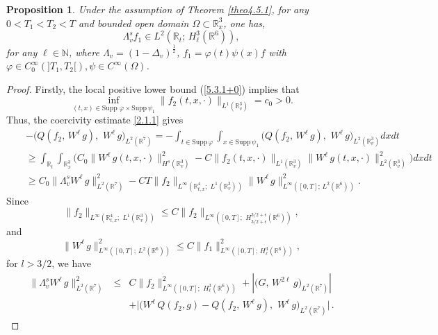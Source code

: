 \documentclass{amsart}[12pt, article]
\newtheorem{prop}[theo]{Proposition}
\begin{document}
\begin{prop}\label{prop5.3.1}
Under the assumption of Theorem \ref{theo4.5.1}, for any
$0<T_1<T_2<T$ and  bounded open domain $\Omega\subset{{{\mathbb R}}}^3_x$,
one has,
\begin{equation*}\label{5.3.4}
\Lambda^s_v f_1\in L^2({{{\mathbb R}}}_t;\, H^3_\ell  ({{{\mathbb R}}}^6)),
\end{equation*}
for any $\ell\in{{\mathbb N}}$, where $\Lambda_v=(1-\Delta_v)^{\frac 12}$,
$f_1=\varphi(t)\psi(x) f$ with
$\varphi\in C^\infty_0(]T_1, T_2[), \psi\in C^\infty(\Omega)$.
\end{prop}

\begin{proof} Firstly,  the local positive lower bound
(\ref{5.3.1+0}) implies that
 $$
 \inf_{(t,  x)\in \mbox{Supp}\,\,\varphi \times \mbox{Supp}\,\psi_1}
 \|{f_2}(t, x, \cdot)\|_{L^1({{{\mathbb R}}}^3_v)}=c_0>0.
 $$
Thus, the coercivity estimate \eqref{2.1.1} gives
\begin{eqnarray*}
&&-\Big(Q({f_2},\,  W^{\ell}\, g),\,\,
 W^{\ell}\, g\Big)_{L^2({{{\mathbb R}}}^7)}=-\int_{t\in
 \mbox{Supp}\,\varphi }\int_{x\in
 \mbox{Supp}\,\psi_1 }\Big(Q({f_2},\,  W^{\ell}\, g),\,\,
W^{\ell}\, g\Big)_{L^2({{{\mathbb R}}}^3_v)} dx dt
\\
&& \geq \int_{{{{\mathbb R}}}_t}\int_{{{{\mathbb R}}}^3_x}\Big( C_0\| W^{\ell}\, g(t, x,
\cdot)\|^2_{H^s({{{\mathbb R}}}^3_v)}
 -C \|{f_2}(t, x, \cdot)\|_{L^1({{{\mathbb R}}}^3_v)}
 \| W^{\ell}\, g(t, x, \cdot)\|^2_{L^2({{{\mathbb R}}}^3_v)}\Big)dx dt \\
&&\geq C_0\|\Lambda^{s}_v W^{\ell}\, g\|^2_{L^2({{{\mathbb R}}}^7)}- C T\|
{f_2}\|_{L^\infty({{{\mathbb R}}}^4_{t, x};\,\,
L^1({{{\mathbb R}}}^3_v))}\|W^{\ell}\,g\|^2_{L^\infty([0, T];\, L^2({{{\mathbb R}}}^6))}.
\end{eqnarray*}
Since
$$
\|{f_2}\|_{L^\infty({{{\mathbb R}}}^4_{t, x};\,\, L^1({{{\mathbb R}}}^3_v))}\leq C
\|{f_2}\|_{L^\infty([0, T];\,\,
H^{3/2+\epsilon}_{3/2+\epsilon}({{{\mathbb R}}}^6))},
$$
and
$$
\|W^{\ell}\,g\|^2_{L^\infty([0, T];\, L^2({{{\mathbb R}}}^6))}\leq C
\|f_1\|^2_{L^\infty([0, T];\, H^3_\ell({{{\mathbb R}}}^6))},
$$
for $l>3/2$, we have
\begin{eqnarray}\label{5.3.6}
\|\Lambda^{s}_v  W^{\ell}\, g\|^2_{L^2({{{\mathbb R}}}^7)}&\leq& C
\|{f_2}\|^2_{L^\infty([0, T];\,\, H^{3}_{\ell}({{{\mathbb R}}}^6))}
+\left|\big(G,\, W^{2\ell}\, g\big)_{L^2({{{\mathbb R}}}^7)}\right|\\
&&+\Big|\big(  W^{\ell}\,  Q({f_2}, g)-Q({f_2},\,  W^{\ell}\,  g),
\,\,  W^{\ell}\, g\big)_{L^2({{{\mathbb R}}}^7)}\Big|\, .\nonumber
\end{eqnarray}


\end{proof}
\end{document}
